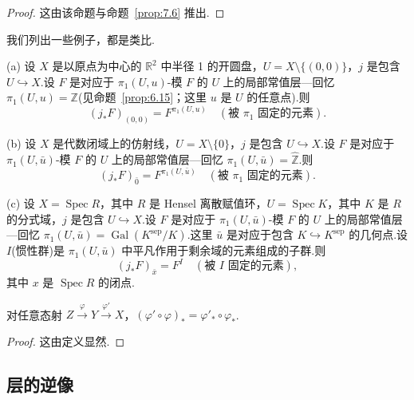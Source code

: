 \begin{proof}
这由该命题与命题~\ref{prop:7.6} 推出.
\end{proof}

\begin{example}\label{ex:8.5}
我们列出一些例子，都是类比.

(a) 设 $X$ 是以原点为中心的 $\mathbb{R}^{2}$ 中半径 1 的开圆盘，$U = X \setminus \{(0,0)\}$，$j$ 是包含 $U \hookrightarrow X$.设 $F$ 是对应于 $\pi_1(U, u)$-模 $F$ 的 $U$ 上的局部常值层---回忆 $\pi_1(U, u) = \mathbb{Z}$(见命题~\ref{prop:6.15}；这里 $u$ 是 $U$ 的任意点).则
\[
(j_{*}F)_{(0,0)} = F^{\pi_1(U,u)} \quad (\text{被 } \pi_1 \text{ 固定的元素}).
\]

(b) 设 $X$ 是代数闭域上的仿射线，$U = X \setminus \{0\}$，$j$ 是包含 $U \hookrightarrow X$.设 $F$ 是对应于 $\pi_1(U, \bar{u})$-模 $F$ 的 $U$ 上的局部常值层---回忆 $\pi_1(U, \bar{u}) = \widehat{\mathbb{Z}}$.则
\[
(j_{*}F)_{\bar{0}} = F^{\pi_1(U,\bar{u})} \quad (\text{被 } \pi_1 \text{ 固定的元素}).
\]

(c) 设 $X = \operatorname{Spec} R$，其中 $R$ 是 Hensel 离散赋值环，$U = \operatorname{Spec} K$，其中 $K$ 是 $R$ 的分式域，$j$ 是包含 $U \hookrightarrow X$.设 $F$ 是对应于 $\pi_1(U, \bar{u})$-模 $F$ 的 $U$ 上的局部常值层---回忆 $\pi_1(U, \bar{u}) = \operatorname{Gal}(K^{\mathrm{sep}}/K)$.这里 $\bar{u}$ 是对应于包含 $K \hookrightarrow K^{\mathrm{sep}}$ 的几何点.设 $I$(惯性群)是 $\pi_1(U, \bar{u})$ 中平凡作用于剩余域的元素组成的子群.则
\[
(j_{*}F)_{\bar{x}} = F^{I} \quad (\text{被 } I \text{ 固定的元素}),
\]
其中 $x$ 是 $\operatorname{Spec} R$ 的闭点.
\end{example}

\begin{proposition}\label{prop:8.6}
对任意态射 $Z \xrightarrow{\varphi} Y \xrightarrow{\varphi'} X$，$(\varphi' \circ \varphi)_{*} = \varphi'_{*} \circ \varphi_{*}$.
\end{proposition}

\begin{proof}
这由定义显然.
\end{proof}

\subsection*{层的逆像}

